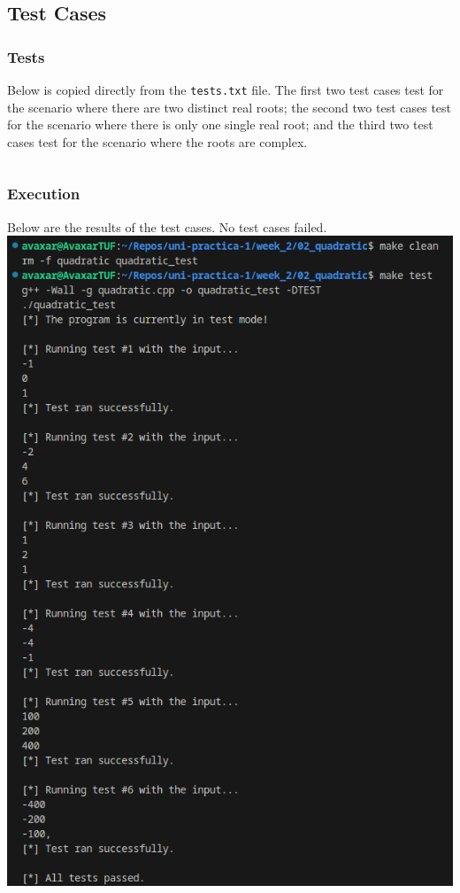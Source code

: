 \documentclass[12pt]{article}
\begin{document}
\subsection{Test Cases}

\subsubsection{Tests}
Below is copied directly from the \texttt{tests.txt} file. The first two test cases test for the scenario where there are two distinct real roots; the second two test cases test for the scenario where there is only one single real root; and the third two test cases test for the scenario where the roots are complex.
\inputminted{text}{02_quadratic/tests.txt}

\subsubsection{Execution}
Below are the results of the test cases. No test cases failed.
\newline\includegraphics[width=\textwidth]{02_quadratic_test}
\end{document}
